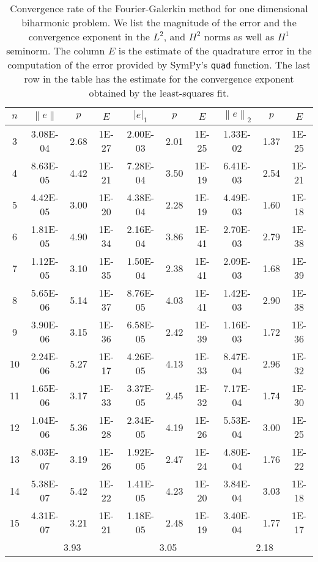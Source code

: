 \documentclass[a4paper,10pt]{article}
\newcommand{\norm}[1]{\ensuremath{\left\|#1\right\|}}
\newcommand{\seminorm}[1]{\ensuremath{\left|#1\right|}}
\begin{document}
  \begin{table}
    \centering
    \begin{tabular}{|c|c|c|c||c|c|c||c|c|c|}
    \hline
    $n$ & $\norm{e}$ & $p$ & $E$ & $\seminorm{e}_1$ & $p$ & $E$ & $\norm{e}_2$ & $p$ & $E$\\
\hline
3 & 3.08E-04 & 2.68 & 1E-27 & 2.00E-03 & 2.01 & 1E-25 & 1.33E-02 & 1.37 & 1E-25\\
4 & 8.63E-05 & 4.42 & 1E-21 & 7.28E-04 & 3.50 & 1E-19 & 6.41E-03 & 2.54 & 1E-21\\
5 & 4.42E-05 & 3.00 & 1E-20 & 4.38E-04 & 2.28 & 1E-19 & 4.49E-03 & 1.60 & 1E-18\\
6 & 1.81E-05 & 4.90 & 1E-34 & 2.16E-04 & 3.86 & 1E-41 & 2.70E-03 & 2.79 & 1E-38\\
7 & 1.12E-05 & 3.10 & 1E-35 & 1.50E-04 & 2.38 & 1E-41 & 2.09E-03 & 1.68 & 1E-39\\
8 & 5.65E-06 & 5.14 & 1E-37 & 8.76E-05 & 4.03 & 1E-41 & 1.42E-03 & 2.90 & 1E-38\\
9 & 3.90E-06 & 3.15 & 1E-36 & 6.58E-05 & 2.42 & 1E-39 & 1.16E-03 & 1.72 & 1E-36\\
10 & 2.24E-06 & 5.27 & 1E-17 & 4.26E-05 & 4.13 & 1E-33 & 8.47E-04 & 2.96 & 1E-32\\
11 & 1.65E-06 & 3.17 & 1E-33 & 3.37E-05 & 2.45 & 1E-32 & 7.17E-04 & 1.74 & 1E-30\\
12 & 1.04E-06 & 5.36 & 1E-28 & 2.34E-05 & 4.19 & 1E-26 & 5.53E-04 & 3.00 & 1E-25\\
13 & 8.03E-07 & 3.19 & 1E-26 & 1.92E-05 & 2.47 & 1E-24 & 4.80E-04 & 1.76 & 1E-22\\
14 & 5.38E-07 & 5.42 & 1E-22 & 1.41E-05 & 4.23 & 1E-20 & 3.84E-04 & 3.03 & 1E-18\\
15 & 4.31E-07 & 3.21 & 1E-21 & 1.18E-05 & 2.48 & 1E-19 & 3.40E-04 & 1.77 & 1E-17\\
\hline
    \hline
    & \multicolumn{3}{c||}{3.93} &
      \multicolumn{3}{c||}{3.05} &
      \multicolumn{3}{c|}{2.18}\\
    \hline
    \end{tabular}
    \label{tab:eig_b_1d}
    \caption{Convergence rate of the Fourier-Galerkin method for one dimensional
    biharmonic problem. We list the magnitude of the error and the convergence
    exponent in the $L^2$, and $H^2$ norms as well as $H^1$ seminorm. The column
    $E$ is the estimate of the quadrature error in the computation of the error
    provided by SymPy's {\tt{quad}} function. The last row in the table has the
    estimate for the convergence exponent obtained by the least-squares fit.}
  \end{table}
\end{document}
